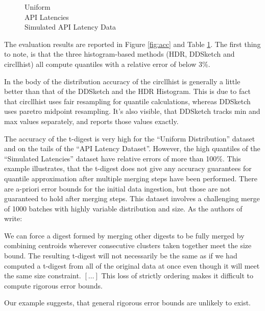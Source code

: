 \documentclass{article}
\theoremstyle{plain}
\theoremstyle{remark}
\begin{document}
\begin{figure}
  Uniform\\
  
  API Latencies\\
  
  Simulated API Latency Data\\
  
  \label{tab:acc}
\end{figure}

The evaluation results are reported in Figure \ref{fig:acc} and Table \ref{tab:acc}.  The first
thing to note, is that the three histogram-based methods (HDR, DDSketch and circllhist) all compute
quantiles with a relative error of below 3\%.

In the body of the distribution accuracy of the circllhist is generally a little better than that of
the DDSketch and the HDR Histogram.  This is due to fact that circllhist uses fair resampling for
quantile calculations, whereas DDSketch uses paretro midpoint resampling.  It's also visible, that
DDSketch tracks min and max values separately, and reports those values exactly.

The accuracy of the t-digest is very high for the ``Uniform Distribution'' dataset and on the tails
of the ``API Latency Dataset''. However, the high quantiles of the ``Simulated Latencies'' dataset
have relative errors of more than 100\%. This example illustrates, that the t-digest does not give
any accuracy guarantees for quantile approximation after multiple merging steps have been performed.
There are a-priori error bounds for the initial data ingestion, but those are not guaranteed to hold
after merging steps. This dataset involves a challenging merge of 1000 batches with highly variable
distribution and size. As the authors of \cite{tdigest} write:

\begin{displayquote}
  We can force a digest formed by merging other digests to be fully merged by combining centroids
  wherever consecutive clusters taken together meet the size bound. The resulting t-digest will not
  necessarily be the same as if we had computed a t-digest from all of the original data at once
  even though it will meet the same size constraint. $[\dots]$ This loss of strictly ordering makes
  it difficult to compute rigorous error bounds.
\end{displayquote}

Our example suggests, that general rigorous error bounds are unlikely to exist.
\end{document}
